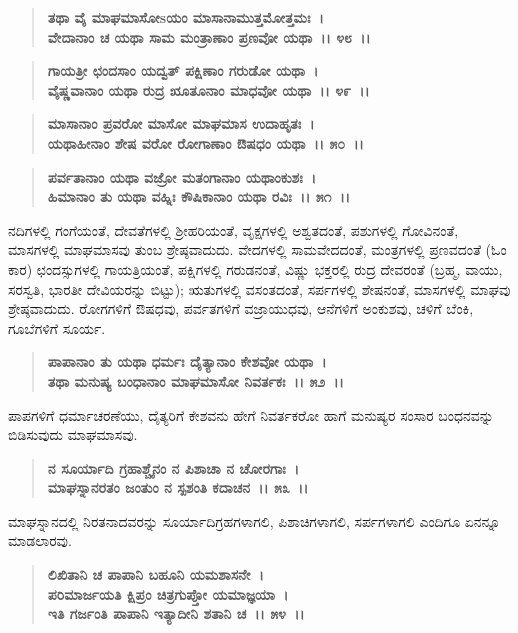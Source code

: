 \begin{verse}
\textbf{ತಥಾ ವೈ ಮಾಘಮಾಸೋsಯಂ ಮಾಸಾನಾಮುತ್ತಮೋತ್ತಮಃ~।}\\\textbf{ವೇದಾನಾಂ ಚ ಯಥಾ ಸಾಮ ಮಂತ್ರಾಣಾಂ ಪ್ರಣವೋ ಯಥಾ~।। ೪೮~।। }
\end{verse}

\begin{verse}
\textbf{ಗಾಯತ್ರೀ ಛಂದಸಾಂ ಯದ್ವತ್ ಪಕ್ಷಿಣಾಂ ಗರುಡೋ ಯಥಾ~।}\\\textbf{ವೈಷ್ಣವಾನಾಂ ಯಥಾ ರುದ್ರ ೠತೂನಾಂ ಮಾಧವೋ ಯಥಾ~।। ೪೯~।।}
\end{verse}

\begin{verse}
\textbf{ಮಾಸಾನಾಂ ಪ್ರವರೋ ಮಾಸೋ ಮಾಘಮಾಸ ಉದಾಹೃತಃ~।}\\\textbf{ಯಥಾಹೀನಾಂ ಶೇಷ ವರೋ ರೋಗಾಣಾಂ ಔಷಧಂ ಯಥಾ~।। ೫೦~।।}
\end{verse}

\begin{verse}
\textbf{ಪರ್ವತಾನಾಂ ಯಥಾ ವಜ್ರೋ ಮತಂಗಾನಾಂ ಯಥಾಂಕುಶಃ~।}\\\textbf{ಹಿಮಾನಾಂ ತು ಯಥಾ ವಹ್ನಿಃ ಕೌಷಿಕಾನಾಂ ಯಥಾ ರವಿಃ~।। ೫೧~।।}
\end{verse}

ನದಿಗಳಲ್ಲಿ ಗಂಗೆಯಂತೆ, ದೇವತೆಗಳಲ್ಲಿ ಶ‍್ರೀಹರಿಯಂತೆ, ವೃಕ್ಷಗಳಲ್ಲಿ ಅಶ್ವತದಂತೆ, ಪಶುಗಳಲ್ಲಿ ಗೋವಿನಂತೆ, ಮಾಸಗಳಲ್ಲಿ ಮಾಘಮಾಸವು ತುಂಬ ಶ್ರೇಷ್ಠವಾದುದು. ವೇದಗಳಲ್ಲಿ ಸಾಮವೇದದಂತೆ, ಮಂತ್ರಗಳಲ್ಲಿ ಪ್ರಣವದಂತೆ (ಓಂ ಕಾರ) ಛಂದಸ್ಸುಗಳಲ್ಲಿ ಗಾಯತ್ರಿಯಂತೆ, ಪಕ್ಷಿಗಳಲ್ಲಿ ಗರುಡನಂತೆ, ವಿಷ್ಣು ಭಕ್ತರಲ್ಲಿ ರುದ್ರ ದೇವರಂತೆ (ಬ್ರಹ್ಮ, ವಾಯು, ಸರಸ್ವತಿ, ಭಾರತೀ ದೇವಿಯರನ್ನು ಬಿಟ್ಟು); ಋತುಗಳಲ್ಲಿ ವಸಂತದಂತೆ, ಸರ್ಪಗಳಲ್ಲಿ ಶೇಷನಂತೆ, ಮಾಸಗಳಲ್ಲಿ ಮಾಘವು ಶ್ರೇಷ್ಠವಾದುದು. ರೋಗಗಳಿಗೆ ಔಷಧವು, ಪರ್ವತಗಳಿಗೆ ವಜ್ರಾಯುಧವು, ಆನೆಗಳಿಗೆ ಅಂಕುಶವು, ಚಳಿಗೆ ಬೆಂಕಿ, ಗೂಬೆಗಳಿಗೆ ಸೂರ್ಯ.

\begin{verse}
\textbf{ಪಾಪಾನಾಂ ತು ಯಥಾ ಧರ್ಮಃ ದೈತ್ಯಾನಾಂ ಕೇಶವೋ ಯಥಾ~।}\\\textbf{ತಥಾ ಮನುಷ್ಯ ಬಂಧಾನಾಂ ಮಾಘಮಾಸೋ ನಿವರ್ತಕಃ~।। ೫೨~।।}
\end{verse}

ಪಾಪಗಳಿಗೆ ಧರ್ಮಾಚರಣೆಯು, ದೈತ್ಯರಿಗೆ ಕೇಶವನು ಹೇಗೆ ನಿವರ್ತಕರೋ ಹಾಗೆ ಮನುಷ್ಯರ ಸಂಸಾರ ಬಂಧನವನ್ನು ಬಿಡಿಸುವುದು ಮಾಘಮಾಸವು.

\begin{verse}
\textbf{ನ ಸೂರ್ಯಾದಿ ಗ್ರಹಾಶ್ಚೈನಂ ನ ಪಿಶಾಚಾ ನ ಚೋರಗಾಃ~।}\\\textbf{ಮಾಘಸ್ನಾನರತಂ ಜಂತುಂ ನ ಸ್ಪಶಂತಿ ಕದಾಚನ~।। ೫೩~।।}
\end{verse}

ಮಾಘಸ್ನಾನದಲ್ಲಿ ನಿರತನಾದವರನ್ನು ಸೂರ್ಯಾದಿಗ್ರಹಗಳಾಗಲಿ, ಪಿಶಾಚಿಗಳಾಗಲಿ, ಸರ್ಪಗಳಾಗಲಿ ಎಂದಿಗೂ ಏನನ್ನೂ ಮಾಡಲಾರವು.

\begin{verse}
\textbf{ಲಿಖಿತಾನಿ ಚ ಪಾಪಾನಿ ಬಹೂನಿ ಯಮಶಾಸನೇ~।}\\\textbf{ಪರಿಮಾರ್ಜಯತಿ ಕ್ಷಿಪ್ರಂ ಚಿತ್ರಗುಪ್ತೋ ಯಮಾಜ್ಞಯಾ~।}\\\textbf{ಇತಿ ಗರ್ಜಂತಿ ಪಾಪಾನಿ ಇತ್ಯಾದೀನಿ ಶತಾನಿ ಚ~।। ೫೪~।।}
\end{verse}

